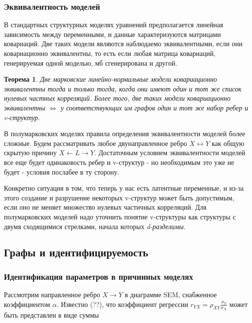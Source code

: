 \documentclass[fleqn]{article}
\newtheorem{theorem}{Теорема}
\numberwithin{equation}{section}
\numberwithin{theorem}{section}
\numberwithin{figure}{section}
\numberwithin{lemma}{section}
\numberwithin{corollary}{section}
\begin{document}
\subsubsection*{Эквивалентность моделей}

В стандартных структурных моделях уравнений предполагается линейная зависимость между переменными, и данные характеризуются матрицами ковариаций. Две таких модели являются наблюдаемо эквивалентными, если они ковариационно эквивалентны,  то есть если любая матрица ковариаций, генерируемая одной моделью, мб сгенерирована и другой.

\begin{theorem}
	Две марковские линейно-нормальные модели ковариационно эквивалентны тогда и только тогда, когда они имеют один и тот же список нулевых частных корреляций. Более того, две таких модели ковариационно эквивалентны $\Leftrightarrow$ у соответствующих им графов один и тот же набор ребер и v-структур.
\end{theorem}

В полумарковских моделях правила определения эквивалентности моделей более сложные. Будем рассматривать любое двунаправленное ребро $X \leftrightarrow Y$ как общую скрытую причину $X \leftarrow L \rightarrow Y$. Достаточным условием эквивалентности моделей все еще будет одинаковость ребер и v-структур - но необходимым это уже не будет - условия послабее в ту сторону. 

Конкретно ситуация в том, что теперь у нас есть латентные переменные,  и из-за этого создание и разрушение некоторых v-структур может быть допустимым, если оно не меняет множество нулевых частичных корреляций. Для полумарковских моделей надо уточнить понятие v-структуры как структуры с двумя сходящимися стрелками, начала которых \textit{d-разделимы}.

\subsection*{Графы и идентифицируемость}

\subsubsection*{Идентификация параметров в причинных моделях}

Рассмотрим направленное ребро $X \to Y$ в диаграмме SEM, снабженное коэффициентом $\alpha$. Известно (??), что коэффициент регрессии  $r_{YX} = \rho_{XY}\frac{\sigma_Y}{\sigma_X}$ может быть представлен в виде суммы
\end{document}
